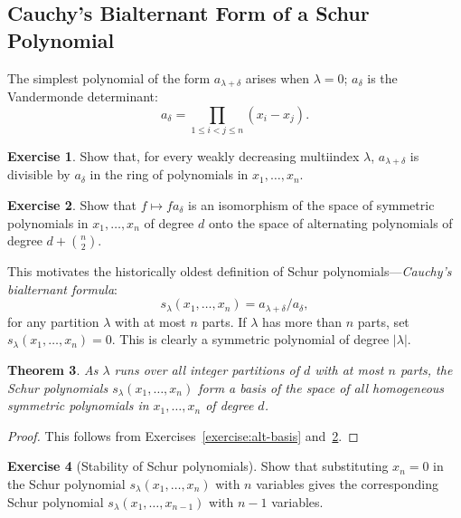 \documentclass[11pt]{amsproc}
\newtheorem{theorem}{Theorem}[subsection]
\theoremstyle{definition}
\theoremstyle{example}
\newtheorem{exercise}[theorem]{Exercise}
\begin{document}
\subsection{Cauchy's Bialternant Form of a Schur Polynomial}
\label{sec:cauchys-bialt-form}
The simplest polynomial of the form $a_{\lambda+\delta}$ arises when $\lambda=0$; $a_\delta$ is the Vandermonde determinant:
\begin{displaymath}
  a_\delta = \prod_{1\leq i<j\leq n}(x_i-x_j).
\end{displaymath}
\begin{exercise}
  Show that, for every weakly decreasing multiindex $\lambda$, $a_{\lambda+\delta}$ is divisible by $a_\delta$ in the ring of polynomials in $x_1,\dotsc,x_n$.
\end{exercise}
\begin{exercise}
  \label{exercise:vandermonde-iso}
  Show that $f\mapsto fa_\delta$ is an isomorphism of the space of symmetric polynomials in $x_1,\dotsc, x_n$ of degree $d$ onto the space of alternating polynomials of degree $d + \binom n2$.
\end{exercise}
This motivates the historically oldest definition of Schur polynomials---\emph{Cauchy's bialternant formula}:
\begin{equation}
  \label{eq:schur}
  s_\lambda(x_1,\dotsc,x_n) = a_{\lambda+\delta}/a_\delta,
\end{equation}
for any partition $\lambda$ with at most $n$ parts.
If $\lambda$ has more than $n$ parts, set $s_\lambda(x_1,\dotsc,x_n) =0$.
This is clearly a symmetric polynomial of degree $|\lambda|$.
\begin{theorem}
  As $\lambda$ runs over all integer partitions of $d$ with at most $n$ parts, the Schur polynomials $s_\lambda(x_1,\dotsc,x_n)$ form a basis of the space of all homogeneous symmetric polynomials in $x_1,\dotsc,x_n$ of degree $d$.
\end{theorem}
\begin{proof}
  This follows from Exercises~\ref{exercise:alt-basis} and~\ref{exercise:vandermonde-iso}.
\end{proof}
\begin{exercise}
  [Stability of Schur polynomials]
  Show that substituting $x_n=0$ in the Schur polynomial $s_\lambda(x_1,\dotsc, x_n)$ with $n$ variables gives the corresponding Schur polynomial $s_\lambda(x_1,\dotsc,x_{n-1})$ with $n-1$ variables.
\end{exercise}
\end{document}
